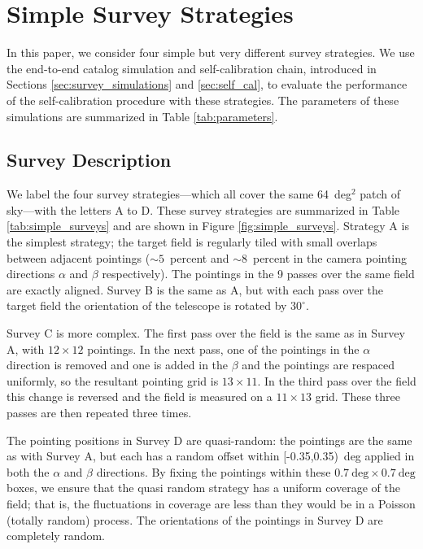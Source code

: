 \documentclass[preprint,pdftex]{aastex}
\begin{document}
\section{Simple Survey Strategies}
\label{sec:simple_surveys}
In this paper, we consider four simple but very different survey strategies. We use the end-to-end catalog simulation and self-calibration chain, introduced in Sections \ref{sec:survey_simulations} and \ref{sec:self_cal}, to evaluate the performance of the self-calibration procedure with these strategies. The parameters of these simulations are summarized in Table \ref{tab:parameters}.

\subsection{Survey Description}
We label the four survey strategies---which all cover the same 64~deg$^2$ patch of sky---with the letters A to D. These survey strategies are summarized in Table \ref{tab:simple_surveys} and are shown in Figure \ref{fig:simple_surveys}. Strategy A is the simplest strategy; the target field is regularly tiled with small overlaps between adjacent pointings ($\sim 5$~percent and $\sim 8$~percent in the camera pointing directions $\alpha$ and $\beta$ respectively). The pointings in the 9 passes over the same field are exactly aligned. Survey B is the same as A, but with each pass over the target field the orientation of the telescope is rotated by $30^\circ$. 

Survey C is more complex. The first pass over the field is the same as in Survey A, with $12 \times 12$ pointings. In the next pass, one of the pointings in the $\alpha$ direction is removed and one is added in the $\beta$ and the pointings are respaced uniformly, so the resultant pointing grid is $13 \times 11$. In the third pass over the field this change is reversed and the field is measured on a $11 \times 13$ grid. These three passes are then repeated three times. 

The pointing positions in Survey D are quasi-random: the pointings are the same as with Survey A, but each has a random offset within [-0.35,0.35)~deg applied in both the $\alpha$ and $\beta$ directions. By fixing the pointings within these $0.7~\text{deg} \times 0.7~\text{deg}$ boxes, we ensure that the quasi random strategy has a uniform coverage of the field; that is, the fluctuations in coverage are less than they would be in a Poisson (totally random) process. The orientations of the pointings in Survey D are completely random. 
\end{document}
